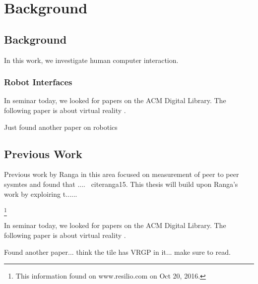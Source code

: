 \chapter{Background}
\label{chap:background}

\section{Background}

In this work, we investigate human computer interaction. 

\subsection{Robot Interfaces}

In seminar today, we looked for papers on the ACM Digital Library. The
following paper is about virtual reality \cite{Kreylos:2006:ESW:1128923.1128948}.

Just found another paper on robotics  \cite{Drascic89}

\section{Previous Work}

Previous work by Ranga in this area focused on measurement of peer to peer sysmtes and found that .... ~cite{ranga15}. This thesis will build upon Ranga's work by exploiring t......

\cite{website1}

\footnote{This information found on www.resilio.com on Oct 20, 2016.}

In seminar today, we looked for papers on the ACM Digital Library. The
following paper is about virtual reality
\cite{Kreylos:2006:ESW:1128923.1128948}.

Found another paper... think the tile has VRGP in it... make sure to read.





